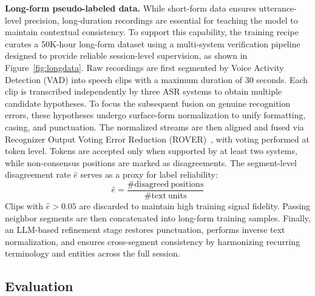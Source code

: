 \documentclass{llmxive}
\begin{document}
\textbf{Long-form pseudo-labeled data.} While short-form data ensures utterance-level precision, long-duration recordings are essential for teaching the model to maintain contextual consistency. To support this capability, the training recipe curates a 50K-hour long-form dataset using a multi-system verification pipeline designed to provide reliable session-level supervision, as shown in Figure~\ref{fig:longdata}. Raw recordings are first segmented by Voice Activity Detection (VAD) into speech clips with a maximum duration of 30 seconds. Each clip is transcribed independently by three ASR systems to obtain multiple candidate hypotheses. To focus the subsequent fusion on genuine recognition errors, these hypotheses undergo surface-form normalization to unify formatting, casing, and punctuation. The normalized streams are then aligned and fused via Recognizer Output Voting Error Reduction (ROVER)~\citep{fiscus1997rover}, with voting performed at token level. Tokens are accepted only when supported by at least two systems, while non-consensus positions are marked as disagreements. The segment-level disagreement rate $\hat{e}$ serves as a proxy for label reliability:
\[
\hat{e}=\frac{\#\mathrm{disagreed\ positions}}{\#\mathrm{text\ units}}
\]
Clips with $\hat{e}>0.05$ are discarded to maintain high training signal fidelity. Passing neighbor segments are then concatenated into long-form training samples. Finally, an LLM-based refinement stage restores punctuation, performs inverse text normalization, and ensures cross-segment consistency by harmonizing recurring terminology and entities across the full session.


\subsection{Evaluation}
\end{document}
